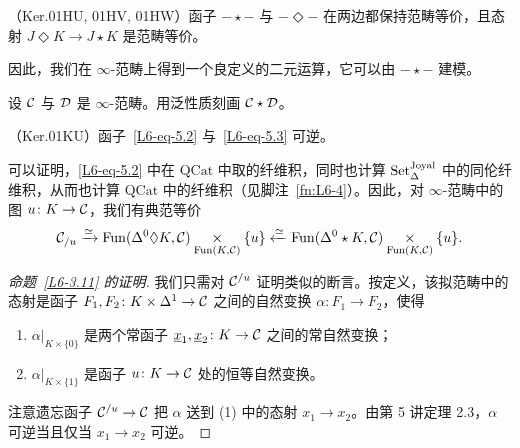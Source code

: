 \begin{proposition}\label{L6-5.7}
（Ker.01HU, 01HV, 01HW）函子 $-\star-$ 与 $-\Diamond-$ 在两边都保持范畴等价，且态射 $J\Diamond K\to J\star K$ 是范畴等价。
\end{proposition}

\begin{remark}\label{L6-5.8}
因此，我们在 $\infty$-范畴上得到一个良定义的二元运算，它可以由 $-\star-$ 建模。
\end{remark}

\begin{exercise}\label{L6-5.9}
设 $\mathcal{C}$ 与 $\mathcal{D}$ 是 $\infty$-范畴。用泛性质刻画 $\mathcal{C}\star\mathcal{D}$。
\end{exercise}

\begin{proposition}\label{L6-5.10}
（Ker.01KU）函子~\eqref{L6-eq-5.2} 与~\eqref{L6-eq-5.3} 可逆。
\end{proposition}

\begin{remark}\label{L6-5.11}
可以证明，\eqref{L6-eq-5.2} 中在 $\mathrm{QCat}$ 中取的纤维积，同时也计算 $\operatorname{Set}^{\mathrm{Joyal}}_{\Delta}$ 中的同伦纤维积，从而也计算 $\mathrm{QCat}$ 中的纤维积（见脚注~\ref{fn:L6-4}）。因此，对 $\infty$-范畴中的图 $u\colon K\to\mathcal{C}$，我们有典范等价
\begin{equation}\label{L6-eq-5.4}
\mathcal{C}_{/u}\xrightarrow{\simeq}\operatorname{Fun}(\Delta^0\Diamond K,\mathcal{C})\underset{\operatorname{Fun}(K,\mathcal{C})}{\times}\{u\}\xleftarrow{\simeq}\operatorname{Fun}(\Delta^0\star K,\mathcal{C})\underset{\operatorname{Fun}(K,\mathcal{C})}{\times}\{u\}.
\end{equation}
\end{remark}

\begin{proof}[命题~\ref{L6-3.11} 的证明]
我们只需对 $\mathcal{C}^{/u}$ 证明类似的断言。按定义，该拟范畴中的态射是函子 $F_1,F_2\colon K\times\Delta^1\to\mathcal{C}$ 之间的自然变换 $\alpha\colon F_1\to F_2$，使得
\begin{enumerate}[label=(\arabic*),leftmargin=2.4em,itemsep=0.1em]
\item $\alpha|_{K\times\{0\}}$ 是两个常函子 $\underline{x}_1,\underline{x}_2\colon K\to\mathcal{C}$ 之间的常自然变换；
\item $\alpha|_{K\times\{1\}}$ 是函子 $u\colon K\to\mathcal{C}$ 处的恒等自然变换。
\end{enumerate}
注意遗忘函子 $\mathcal{C}^{/u}\to\mathcal{C}$ 把 $\alpha$ 送到 (1) 中的态射 $x_1\to x_2$。由第 5 讲定理 2.3，$\alpha$ 可逆当且仅当 $x_1\to x_2$ 可逆。
\end{proof}

